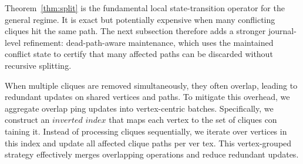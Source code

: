 Theorem~\ref{thm:split} is the fundamental local state-transition operator for the general regime.
%
It is exact but potentially expensive when many conflicting cliques hit the same path.
%
The next subsection therefore adds a stronger journal-level refinement: dead-path-aware maintenance, which uses the maintained conflict state to certify that many affected paths can be discarded without recursive splitting.







When multiple cliques are removed simultaneously, they often overlap, leading to redundant updates on shared
vertices and paths. To mitigate this overhead, we aggregate overlap
ping updates into vertex-centric batches. Specifically, we construct
an $inverted$ $index$ that maps each vertex to the set of cliques con
taining it. Instead of processing cliques sequentially, we iterate over
vertices in this index and update all affected clique paths per ver
tex. This vertex-grouped strategy effectively merges overlapping
operations and reduce redundant updates.



